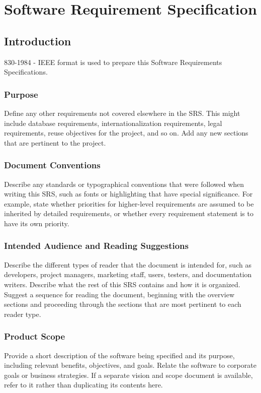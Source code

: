 \chapter{Software Requirement Specification}
\section{Introduction}
830-1984 - IEEE format is used to prepare this Software Requirements Specifications\cite{IEEE_srs}.

\subsection*{Purpose}
Define any other requirements not covered elsewhere in the SRS. This might include database requirements, internationalization requirements, legal requirements, reuse objectives for the project, and so on. Add any new sections that are pertinent to the project.

\subsection*{Document Conventions}
Describe any standards or typographical conventions that were followed when writing this SRS, such as fonts or highlighting that have special significance. For example, state whether priorities  for higher-level requirements are assumed to be inherited by detailed requirements, or whether every requirement statement is to have its own priority. 

\subsection*{Intended Audience and Reading Suggestions}
Describe the different types of reader that the document is intended for, such as developers, project managers, marketing staff, users, testers, and documentation writers. Describe what the rest of this SRS contains and how it is organized. Suggest a sequence for reading the document, beginning with the overview sections and proceeding through the sections that are most pertinent to each reader type.

\subsection*{Product Scope}
Provide a short description of the software being specified and its purpose, including relevant benefits, objectives, and goals. Relate the software to corporate goals or business strategies. If a separate vision and scope document is available, refer to it rather than duplicating its contents here.

